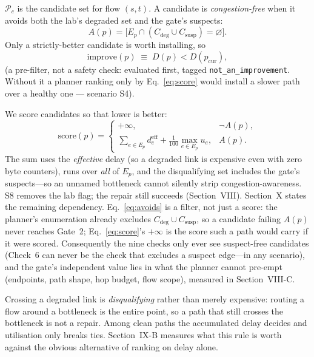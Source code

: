 \documentclass[conference]{IEEEtran}
\begin{document}
$\mathcal{P}_c$ is the candidate set for flow $(s,t)$. A candidate is
\emph{congestion-free} when it avoids both the lab's degraded set and the
gate's suspects:
\begin{equation}
A(p)=\bigl[E_p\cap (C_{\mathrm{deg}}\cup C_{\mathrm{susp}})=\varnothing\bigr].
\label{eq:avoids}
\end{equation}
Only a strictly-better candidate is worth installing, so
\begin{equation}
\mathrm{improve}(p) \;\equiv\; D(p) < D(p_{\mathrm{cur}}),
\label{eq:improve}
\end{equation}
(a pre-filter, not a safety check: evaluated first, tagged
\texttt{not\_an\_improvement}. Without it a planner ranking only by
Eq.~\eqref{eq:score} would install a slower path over a healthy one ---
scenario S4).

We score candidates so that lower is better:
\begin{equation}
\mathrm{score}(p)=
\begin{cases}
+\infty, & \neg A(p),\\[2pt]
\displaystyle\sum_{e\in E_p} d^{\mathrm{eff}}_e
 + \frac{1}{100}\max_{e\in E_p} u_e, & A(p).
\end{cases}
\label{eq:score}
\end{equation}
The sum uses the \emph{effective} delay (so a degraded link is expensive
even with zero byte counters), runs over \emph{all} of $E_p$, and the
disqualifying set includes the gate's suspects---so an unnamed bottleneck
cannot silently strip congestion-awareness. S8 removes the lab flag; the
repair still succeeds (Section~VIII). Section~X states the remaining
dependency.
Eq.~\eqref{eq:avoids} is a filter, not just a score: the planner's
enumeration already excludes $C_{\mathrm{deg}}\cup C_{\mathrm{susp}}$, so
a candidate failing $A(p)$ never reaches Gate~2; Eq.~\eqref{eq:score}'s
$+\infty$ is the score such a path would carry if it were scored.
Consequently the nine checks only ever see suspect-free candidates (Check~6
can never be the check that excludes a suspect edge---in any scenario),
and the gate's independent value lies in what the planner cannot pre-empt
(endpoints, path shape, hop budget, flow scope), measured in Section~VIII-C.

Crossing a degraded link is \emph{disqualifying} rather than merely
expensive: routing a flow around a bottleneck is the entire point, so a path
that still crosses the bottleneck is not a repair. Among clean paths the
accumulated delay decides and utilisation only breaks ties. Section~IX-B
measures what this rule is worth against the obvious alternative of ranking
on delay alone.
\end{document}
